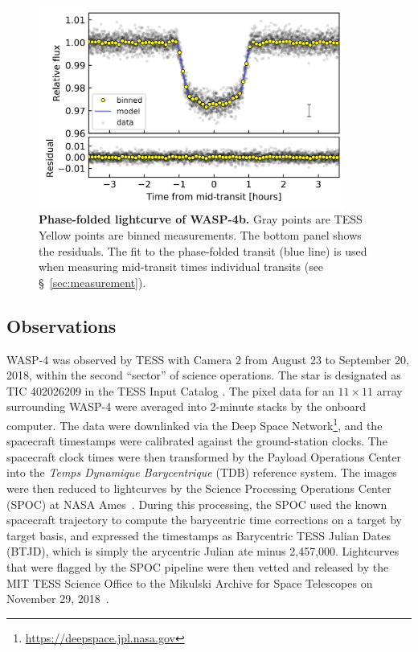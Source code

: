 \documentclass[12pt,twocolumn,tighten]{aastex62}
\begin{document}
{\begin{figure}[t]
    \begin{center}
        \includegraphics[width=0.9\textwidth]{f2.png}
    \end{center}
    \vspace{-0.7cm}
    \caption{
        {\bf Phase-folded lightcurve of WASP-4b.} Gray points are
        TESS  
        Yellow points are binned measurements.  The bottom
        panel shows the residuals.  The fit to the phase-folded
        transit (blue line) is used when measuring mid-transit times
         individual transits (see 
        \S~\ref{sec:measurement}).
        \label{fig:phasefold}
    }
\end{figure}

\subsection{Observations}

WASP-4 was observed by TESS with Camera 2 from August 23 to September
20, 2018, within the second ``sector'' of science operations.  The
star is designated as TIC 402026209 in the TESS Input Catalog
\citep{stassun_TIC_2018}.  The pixel data for an $11\times11$ array
surrounding WASP-4 were averaged into 2-minute stacks by the onboard
computer.  The data were downlinked via the Deep Space Network\footnote{\url{https://deepspace.jpl.nasa.gov}}, and
the spacecraft timestamps were calibrated against the ground-station
clocks.  The spacecraft clock times were then transformed by the
Payload Operations Center into the {\it Temps Dynamique Barycentrique}
(TDB) reference system.  The images were then reduced to lightcurves
by the Science Processing Operations Center (SPOC) at NASA
Ames~\citep{jenkins_tess_2016}.  During this processing, the SPOC used
the known spacecraft trajectory to compute the barycentric time
corrections on a target by target basis, and expressed the timestamps
as Barycentric TESS Julian Dates (BTJD), which is simply the
arycentric Julian ate minus
2{,}457{,}000.  Lightcurves that were flagged  by the SPOC pipeline  were then vetted and released by the MIT TESS
Science Office to the Mikulski Archive for Space Telescopes on
November 29, 2018~\citep{ricker_tess_alerts_2018}.

}
\end{document}

